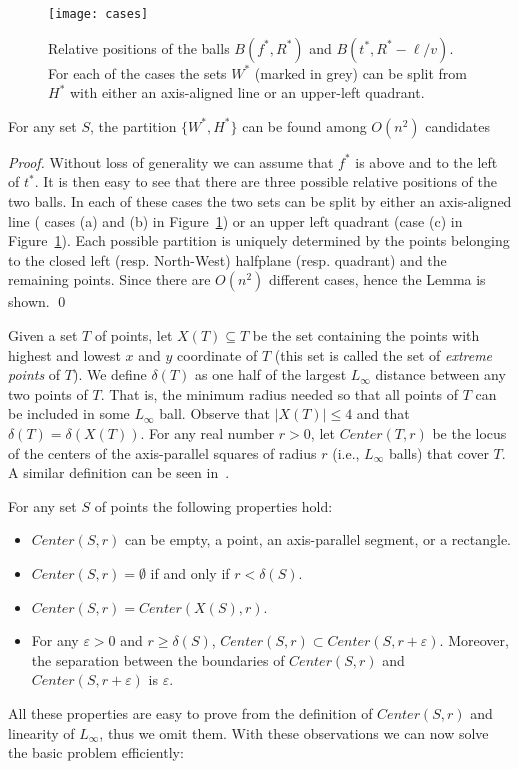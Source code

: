 \documentclass{llncs}
\def\eps{\varepsilon}
\newcommand{\cen}[1]{Center({#1})}
\newcommand{\ball}[1]{B({#1})}
\begin{document}
\begin{figure}[h]
    \centering
    \texttt{[image: cases]}
    \caption{\small{Relative positions of the balls $\ball{f^*,R^*}$ and $\ball{t^*,R^*-\ell/v}$. For each of the cases the sets $W^*$ (marked in grey) can be split from $H^*$ with either an axis-aligned line or an upper-left quadrant.}}
    \label{fig:cases}
\end{figure}
\begin{lemma}\label{lem_key}
For any set $S$, the partition $\{W^*,H^*\}$ can be found among $O(n^2)$ candidates
\end{lemma}
\begin{proof}
Without loss of generality we can assume that $f^*$ is above and to the left of $t^*$. It is then easy to see that there are three possible relative positions of the two balls. In each of these cases the two sets can be split by either an axis-aligned line ( cases (a) and (b) in Figure~\ref{fig:cases}) or an upper left quadrant (case (c) in  Figure~\ref{fig:cases}).
Each possible partition is uniquely determined by the points belonging to the closed left (resp. North-West) halfplane (resp. quadrant)  and the remaining points.
Since there are $O(n^2)$ different cases, hence the Lemma is shown.
\qed


\end{proof}

Given a set $T$ of points, let  $X(T)\subseteq T$ be the set containing the points with highest and lowest $x$ and $y$ coordinate of $T$ (this set is called the set of {\em extreme points} of $T$). We define $\delta(T)$ as one half of the largest $L_\infty$ distance between any two points of $T$. That is, the  minimum radius needed so that all points of $T$ can be included in some $L_{\infty}$ ball. Observe that $|X(T)|\leq 4$ and that $\delta(T)=\delta(X(T))$.  For any real number $r>0$, let $\cen{T,r}$ be the locus of the centers of the axis-parallel squares of radius $r$ (i.e., $L_\infty$ balls) that cover $T$. A similar definition can be seen in~\cite{huang03}.

\begin{lemma}\label{lem_propcen}
For any set $S$ of points the following properties hold:
\begin{itemize}
    \item $\cen{S,r}$ can be empty, a point, an axis-parallel segment, or a rectangle.
    \item $\cen{S,r}=\emptyset$ if and only if $r<\delta(S)$.
    \item $\cen{S,r}=\cen{X(S),r}$. \item For any $\eps>0$ and $r\geq \delta(S)$, $\cen{S,r}\subset\cen{S,r+\eps}$. Moreover, the separation between the boundaries of $\cen{S,r}$ and $\cen{S,r+\eps}$ is  $\eps$.
\end{itemize}
\end{lemma}
All these properties are easy to prove from the definition of $\cen{S,r}$ and linearity of $L_\infty$, thus we omit them. With these observations we can now solve the basic problem efficiently:
\end{document}
